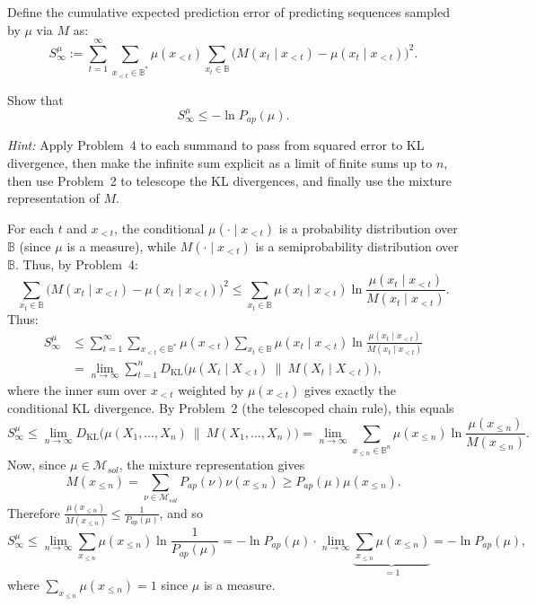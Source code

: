 \documentclass[fontsize=11pt, parskip=half]{scrartcl}
\newenvironment{solution}{%
    \begin{tcolorbox}[colback=black!5!white, colframe=black!50!white, 
      title={\textbf{Solution}}, fonttitle=\normalfont, breakable]
  }{\end{tcolorbox}}
\newenvironment{solution}{\expandafter\comment}{\expandafter\endcomment}
\begin{document}
Define the cumulative expected prediction error of predicting sequences sampled by $\mu$ via $M$ as:
\[
S^{\mu}_{\infty} := \sum_{t = 1}^{\infty} \sum_{x_{<t} \in \mathbb{B}^*} \mu(x_{<t}) \sum_{x_t \in \mathbb{B}} \big( M(x_t \mid x_{<t}) - \mu(x_t \mid x_{<t}) \big)^2.
\]

Show that
\[
S_{\infty}^{\mu} \leq - \ln P_{ap}(\mu).
\]

\textit{Hint:} Apply Problem~4 to each summand to pass from squared error to KL divergence, then make the infinite sum explicit as a limit of finite sums up to $n$, then use Problem~2 to telescope the KL divergences, and finally use the mixture representation of $M$.

\begin{solution}
For each $t$ and $x_{<t}$, the conditional $\mu(\cdot \mid x_{<t})$ is a probability distribution over $\mathbb{B}$ (since $\mu$ is a measure), while $M(\cdot \mid x_{<t})$ is a semiprobability distribution over $\mathbb{B}$. Thus, by Problem~4:
\[
\sum_{x_t \in \mathbb{B}} \big( M(x_t \mid x_{<t}) - \mu(x_t \mid x_{<t}) \big)^2 \leq \sum_{x_t \in \mathbb{B}} \mu(x_t \mid x_{<t}) \ln \frac{\mu(x_t \mid x_{<t})}{M(x_t \mid x_{<t})}.
\]
Thus:
\begin{align*}
S_{\infty}^{\mu} &\leq \sum_{t=1}^{\infty} \sum_{x_{<t} \in \mathbb{B}^*} \mu(x_{<t}) \sum_{x_t \in \mathbb{B}} \mu(x_t \mid x_{<t}) \ln \frac{\mu(x_t \mid x_{<t})}{M(x_t \mid x_{<t})} \\
&= \lim_{n \to \infty} \sum_{t=1}^{n} D_{\text{KL}}\big( \mu(X_t \mid X_{<t}) \ \| \ M(X_t \mid X_{<t}) \big),
\end{align*}
where the inner sum over $x_{<t}$ weighted by $\mu(x_{<t})$ gives exactly the conditional KL divergence. By Problem~2 (the telescoped chain rule), this equals
\[
S_{\infty}^{\mu} \leq \lim_{n \to \infty} D_{\text{KL}}\big( \mu(X_1, \dots, X_n) \ \| \ M(X_1, \dots, X_n) \big) = \lim_{n \to \infty} \sum_{x_{\leq n} \in \mathbb{B}^n} \mu(x_{\leq n}) \ln \frac{\mu(x_{\leq n})}{M(x_{\leq n})}.
\]
Now, since $\mu \in \mathcal{M}_{sol}$, the mixture representation gives
\[
M(x_{\leq n}) = \sum_{\nu \in \mathcal{M}_{sol}} P_{ap}(\nu) \nu(x_{\leq n}) \geq P_{ap}(\mu) \mu(x_{\leq n}).
\]
Therefore $\frac{\mu(x_{\leq n})}{M(x_{\leq n})} \leq \frac{1}{P_{ap}(\mu)}$, and so
\[
S_{\infty}^{\mu} \leq \lim_{n \to \infty} \sum_{x_{\leq n}} \mu(x_{\leq n}) \ln \frac{1}{P_{ap}(\mu)} = -\ln P_{ap}(\mu) \cdot \lim_{n \to \infty} \underbrace{\sum_{x_{\leq n}} \mu(x_{\leq n})}_{= 1} = -\ln P_{ap}(\mu),
\]
where $\sum_{x_{\leq n}} \mu(x_{\leq n}) = 1$ since $\mu$ is a measure. \qedhere
\end{solution}
\end{document}
